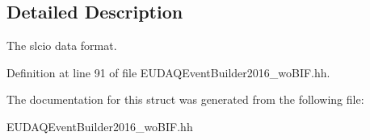 \subsection{Detailed Description}
The slcio data format. 

Definition at line 91 of file E\-U\-D\-A\-Q\-Event\-Builder2016\-\_\-wo\-B\-I\-F.\-hh.



The documentation for this struct was generated from the following file\-:\begin{DoxyCompactItemize}
\item 
E\-U\-D\-A\-Q\-Event\-Builder2016\-\_\-wo\-B\-I\-F.\-hh\end{DoxyCompactItemize}
